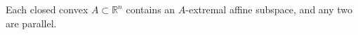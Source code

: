 Each closed convex $A\subset\mathbb{R}^n$ contains an $A$-extremal affine subspace, and any two are parallel.

